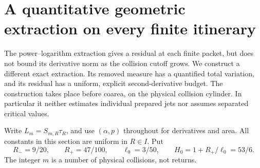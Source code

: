 \section{A quantitative geometric extraction on every finite itinerary}
\label{sec:geometric-raw-extraction}
The power--logarithm extraction gives a residual at each finite packet,
but does not bound its derivative norm as the collision cutoff grows.
We construct a different exact extraction. Its removed measure has a
quantified total variation, and its residual has a uniform, explicit
second-derivative budget. The construction takes place before coarea,
on the physical collision cylinder. In particular it neither estimates
individual prepared jets nor assumes separated critical values.

Write $L_m=S_{m,R}\tau_R$, and use $(\alpha,p)$ throughout for derivatives
and area. All constants in this section are uniform in $R\in I$.
Put
\[
 R_-=9/20,\qquad R_+=47/100,\qquad \ell_0=3/50,
 \qquad H_0=1+R_+/\ell_0=53/6.
\]
The integer $m$ is a number of physical collisions, not returns.

